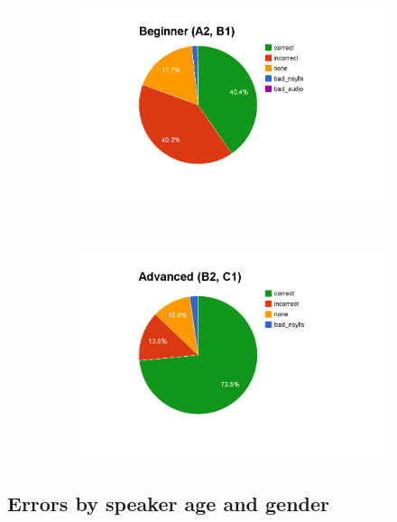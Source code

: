 			
			\begin{figure}[htb]
				\centering
				\begin{subfigure}[t]{0.5\textwidth}
					\includegraphics[width=\textwidth]{img/annotation/beginnerPie}
					\caption{}
					\label{fig:levelgroupspies:beg}
				\end{subfigure}%
				~
				\begin{subfigure}[t]{0.5\textwidth}
					\includegraphics[width=\textwidth]{img/annotation/advancedPie}
					\caption{}
					\label{fig:levelgroupspies:adv}
				\end{subfigure}%
				\caption{}
				\label{fig:levelgroupspies}
			\end{figure}	
			
		
		\subsection{Errors by speaker age and gender}
		\label{sec:results:agegender}
			\TODO{}
			
